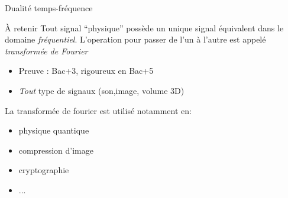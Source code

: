 \documentclass{beamer}
\begin{document}
\begin{frame}{Dualité temps-fréquence}
  \begin{alertblock}{À retenir}
    Tout signal ``physique'' possède un unique signal équivalent dans le domaine \emph{fréquentiel}. L'operation pour passer de l'un à l'autre est appelé \emph{transformée de Fourier}
  \end{alertblock}
  \begin{itemize}[<+->]
    \item Preuve : Bac+3, rigoureux en Bac+5
    \item \emph{Tout} type de signaux (son,image, volume 3D)
  \end{itemize}\pause
  La transformée de fourier est utilisé notamment en:
  \begin{itemize}[<+->]
    \item physique quantique
    \item compression d'image
    \item cryptographie
    \item ...
  \end{itemize}


\end{frame}
\end{document}
